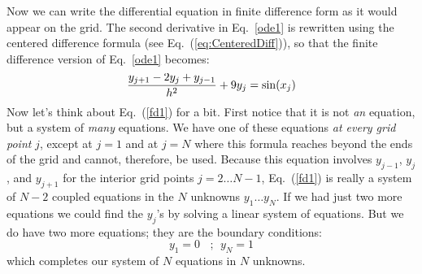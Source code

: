 Now we can write the differential equation in finite difference
form as it would appear on the grid.  The second derivative in
Eq.~\eqref{ode1} is rewritten using the centered difference
formula (see Eq.~(\ref{eq:CenteredDiff})), so that the finite
difference version of Eq.~\eqref{ode1} becomes:
\begin{equation}\label{fd1}
    {y_{j+1}-2y_j+y_{j-1} \over h^2} + 9 y_j = \sin(x_j)
\end{equation}
Now let's think about Eq.~(\ref{fd1}) for a bit. First notice
that it is not {\it an} equation, but a system of {\it many}
equations. We have one of these equations {\it at every grid point}
$j$, except at $j=1$ and at $j=N$ where this formula reaches
beyond the ends of the grid and cannot, therefore, be used.
Because this equation involves $y_{j-1}$, $y_j$, and $y_{j+1}$
for the interior grid points $j=2\ldots N-1$, Eq.~(\ref{fd1}) is
really a system of $N-2$ coupled equations in the $N$ unknowns
$y_1 \ldots y_{N}$. If we had just two more equations we could
find the $y_j$'s by solving a linear system of equations. But
we do have two more equations; they are the boundary
conditions:
\begin{equation}
    y_1=0~~~~;~~y_N=1
    \label{bc1}
\end{equation}
which completes our system of $N$ equations in $N$ unknowns.

